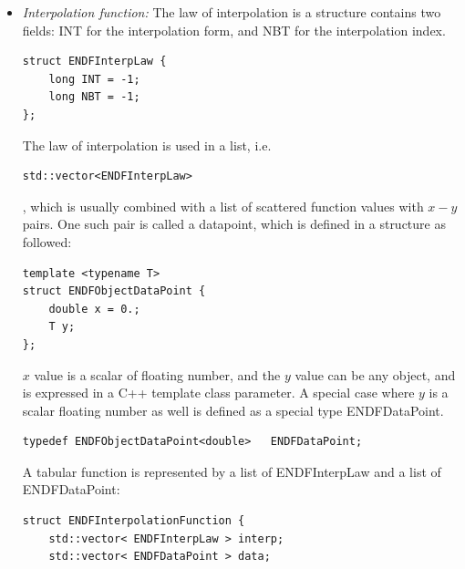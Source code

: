 \begin{itemize}
\item{\em Interpolation function: } 
The law of interpolation is a structure contains two fields: INT for the interpolation form, and NBT for the interpolation index.
\begin{verbatim} 
struct ENDFInterpLaw {
    long INT = -1;
    long NBT = -1;
};
\end{verbatim}
The law of interpolation is used in a list, i.e. 
\begin{verbatim} 
std::vector<ENDFInterpLaw> 
\end{verbatim}
, which is usually combined with a list of scattered function values with $x-y$ pairs. One such pair is called a datapoint, which is defined in a structure as followed:
\begin{verbatim} 
template <typename T>
struct ENDFObjectDataPoint {
    double x = 0.;
    T y;
};
\end{verbatim}
$x$ value is a scalar of floating number, and the $y$ value can be any object, and is expressed in a C++ template class parameter. A special case where $y$ is a scalar floating number as well is defined as a special type ENDFDataPoint.
\begin{verbatim} 
typedef ENDFObjectDataPoint<double>   ENDFDataPoint;
\end{verbatim}
A tabular function is represented by a list of ENDFInterpLaw and a list of ENDFDataPoint:
\begin{verbatim}
struct ENDFInterpolationFunction {
    std::vector< ENDFInterpLaw > interp;
    std::vector< ENDFDataPoint > data;
    

\end{verbatim}
\end{itemize}
